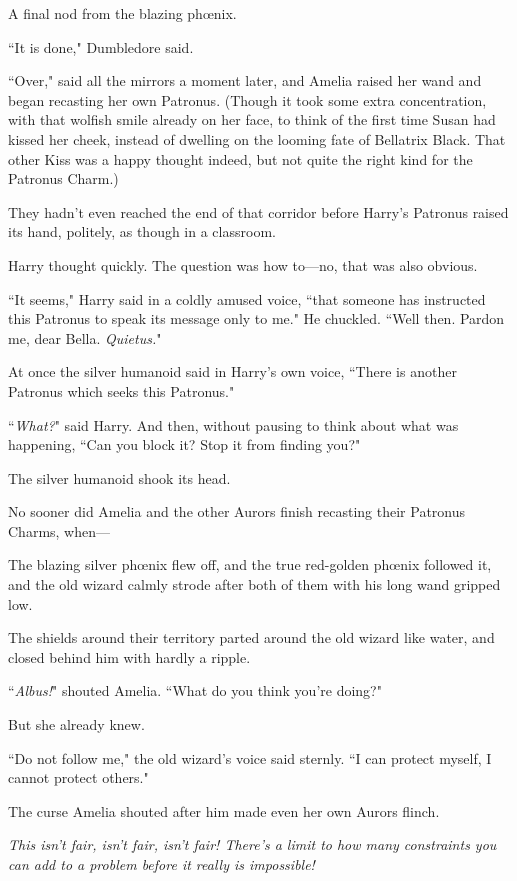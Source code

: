 A final nod from the blazing phœnix.

``It is done," Dumbledore said.

``Over," said all the mirrors a moment later, and Amelia raised her wand and began recasting her own Patronus. (Though it took some extra concentration, with that wolfish smile already on her face, to think of the first time Susan had kissed her cheek, instead of dwelling on the looming fate of Bellatrix Black. That other Kiss was a happy thought indeed, but not quite the right kind for the Patronus Charm.)

\later

They hadn't even reached the end of that corridor before Harry's Patronus raised its hand, politely, as though in a classroom.

Harry thought quickly. The question was how to—no, that was also obvious.

``It seems," Harry said in a coldly amused voice, ``that someone has instructed this Patronus to speak its message only to me." He chuckled. ``Well then. Pardon me, dear Bella. \emph{Quietus.}"

At once the silver humanoid said in Harry's own voice, ``There is another Patronus which seeks this Patronus."

``\emph{What?}" said Harry. And then, without pausing to think about what was happening, ``Can you block it? Stop it from finding you?"

The silver humanoid shook its head.

\later

No sooner did Amelia and the other Aurors finish recasting their Patronus Charms, when—

The blazing silver phœnix flew off, and the true red-golden phœnix followed it, and the old wizard calmly strode after both of them with his long wand gripped low.

The shields around their territory parted around the old wizard like water, and closed behind him with hardly a ripple.

``\emph{Albus!}" shouted Amelia. ``What do you think you're doing?"

But she already knew.

``Do not follow me," the old wizard's voice said sternly. ``I can protect myself, I cannot protect others."

The curse Amelia shouted after him made even her own Aurors flinch.

\later

\emph{This isn't fair, isn't fair, isn't fair! There's a limit to how many constraints you can add to a problem before it really is impossible!}

